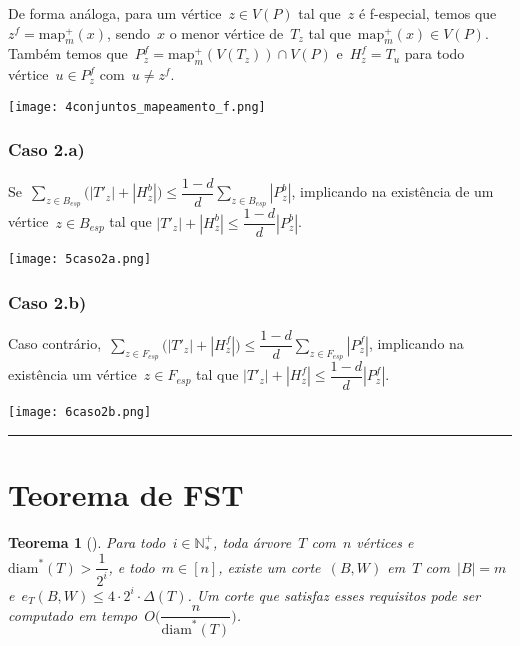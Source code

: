 \documentclass[a0,portrait]{a0poster}
\newtheorem{teo}{Teorema}
\newcommand{\diam}{\mathrm{diam}}
\newcommand{\map}{\mathrm{map}}
\begin{document}
\begin{multicols}{3}
    \bigskip
    \bigskip

    De forma análoga, para um vértice~${z\in V(P)}$ tal 
    que~$z$ é f-especial,
    temos que~${z^f = \map^+_m(x)}$,
    sendo~$x$ o menor vértice de~$T_z$ tal 
    que~${\map^+_m(x)\in V(P)}$.
    Também temos
    que~${P_z^f = \map^+_m(V(T_z))\cap V(P)}$
    e~${H_z^f =T_u}$ para todo 
    vértice~${u\in P_z^f}$ com~${u\ne z^f}$.

\begin{center}
    \texttt{[image: 4conjuntos\_mapeamento\_f.png]}
\end{center}
    \subsubsection*{Caso 2.a)}
        Se~${\displaystyle\sum_{z\in B_{esp}}
        \Big(|T'_{z}|+|H_z^b|\Big)\le
        \dfrac{1-d}{d}\displaystyle\sum_{z\in B_{esp}}|P_z^b|}$,
        implicando na existência de um vértice~${z\in B_{esp}}$ 
        tal que ${|T'_{z}|+|H_z^b|\le
        \dfrac{1-d}{d}|P_z^b|}$.

\begin{center}
    \texttt{[image: 5caso2a.png]}
\end{center}
    \subsubsection*{Caso 2.b)}
        Caso contrário,~${\displaystyle\sum_{z\in F_{esp}}
        \Big(|T'_{z}|+|H_z^f|\Big)\le
        \dfrac{1-d}{d}\displaystyle\sum_{z\in F_{esp}}|P_z^f|}$,
        implicando na existência um vértice~${z\in F_{esp}}$ 
        tal que ${|T'_{z}|+|H_z^f|\le
        \dfrac{1-d}{d}|P_z^f|}$.

\begin{center}
\texttt{[image: 6caso2b.png]}
\end{center}
\noindent\rule[0.5ex]{\linewidth}{1pt}

\section*{Teorema de FST}

\begin{teo}[]
\label{teo:corteExato}
	Para todo~${i\in \mathbb{N^+_*}}$, toda árvore~$T$ com~$n$
    vértices e~${\diam^*(T)>\dfrac{1}{2^i}}$, e todo~${m\in[n]}$,
    existe um corte~$(B,W)$ em~$T$ com~${|B|=m}$ 
    e~$e_T(B,W)\le 4\cdot 2^i\cdot \Delta(T)$.
    Um corte que satisfaz esses requisitos pode ser computado
    em tempo~${O\Big(\dfrac{n}{\diam^*(T)}\Big)}$.
\end{teo}


\end{multicols}
\end{document}

